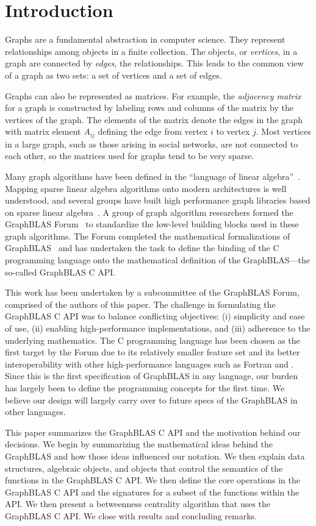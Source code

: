 \section{Introduction}
\label{sec:intro}

Graphs are a fundamental abstraction in computer science.  They represent
relationships among objects in a finite collection.   The objects, or
\emph{vertices}, in a graph are connected by \emph{edges}, the relationships.  This leads
to the common view of a graph as two sets: a set of vertices and a set
of edges.

Graphs can also be represented as matrices.   For example, the
\emph{adjacency matrix} for a graph is constructed by labeling rows and
columns of the matrix by the vertices of the graph.  The elements of
the matrix denote the edges in the graph with matrix element $A_{ij}$
defining the edge from vertex $i$ to vertex $j$.  Most
vertices in a large graph, such as those arising in social networks,
are not connected to each other, so the matrices used for graphs tend to
be very sparse.

Many graph algorithms have been defined in the ``language of linear
algebra''~\cite{kepner2011graph}.  Mapping sparse linear algebra algorithms 
onto modern architectures is well understood, and several 
groups have built high
performance graph libraries based on sparse linear algebra~\cite{combblas,
gadepally2015graphulo, gpi2016, sundaram2015graphmat,che2016programming}.  A group
of graph algorithm researchers formed the GraphBLAS
Forum~\cite{graphblas_web} to standardize the low-level building
blocks used in these graph algorithms.  The Forum completed the
mathematical formalizations of GraphBLAS~\cite{mathgraphblas16} and
has undertaken the task to define the
binding of the C programming language onto the mathematical definition of
the GraphBLAS---the so-called GraphBLAS C API.  
 

This work has been undertaken by a subcommittee of the GraphBLAS Forum, comprised of
the authors of this paper.  The challenge in formulating
the GraphBLAS C API was to balance conflicting 
objectives: (i) simplicity and ease of use,
(ii) enabling high-performance implementations, and (iii) adherence to
the underlying mathematics. 
The C programming language has been chosen as the first target by the Forum due
to its relatively smaller feature set and its better interoperability with other high-performance 
languages such as Fortran and \Cpp.
Since this is the first specification of GraphBLAS in any language, our burden 
has largely been to define the programming concepts for the first time. We believe
our design will largely carry over to future specs of the GraphBLAS in other 
languages. 

This paper summarizes the GraphBLAS C API and the
motivation behind our decisions. 
We begin by summarizing the 
mathematical ideas behind the GraphBLAS and how those ideas
influenced our notation.  We then explain data structures,
algebraic objects, and objects that control the semantics of the functions
in the GraphBLAS C API.  We then define the
core operations in the GraphBLAS C  API and the signatures
for a subset of the functions  within the API.  We then present a betweenness centrality 
algorithm that uses the GraphBLAS C  API. We close with results
and concluding remarks.
